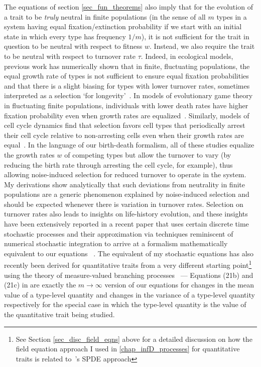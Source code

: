 The equations of section \ref{sec_fun_theorems} also imply that for the evolution of a trait to be \emph{truly} neutral in finite populations (in the sense of all $m$ types in a system having equal fixation/extinction probability if we start with an initial state in which every type has frequency $1/m$), it is not sufficient for the trait in question to be neutral with respect to fitness $w$. Instead, we also require the trait to be neutral with respect to turnover rate $\tau$.  Indeed, in ecological models, previous work has numerically shown that in finite, fluctuating populations, the equal growth rate of types is not sufficient to ensure equal fixation probabilities and that there is a slight biasing for types with lower turnover rates, sometimes interpreted as a selection `for longevity'~\citep{lin_features_2012, oliveira_advantage_2017,balasekaran_quasi-neutral_2022}. In models of evolutionary game theory in fluctuating finite populations, individuals with lower death rates have higher fixation probability even when growth rates are equalized~\citep{huang_stochastic_2015, czuppon_fixation_2018}. Similarly, models of cell cycle dynamics find that selection favors cell types that periodically arrest their cell cycle relative to non-arresting cells even when their growth rates are equal~\citep{wodarz_effect_2017}. In the language of our birth-death formalism, all of these studies equalize the growth rates $w$ of competing types but allow the turnover to vary (by reducing the birth rate through arresting the cell cycle, for example), thus allowing noise-induced selection for reduced turnover to operate in the system. My derivations show analytically that such deviations from neutrality in finite populations are a generic phenomenon explained by noise-induced selection and should be expected whenever there is variation in turnover rates. Selection on turnover rates also leads to insights on life-history evolution, and these insights have been extensively reported in a recent paper that uses certain discrete time stochastic processes and their approximation via techniques reminiscent of numerical stochastic integration to arrive at a formalism mathematically equivalent to our equations ~\citep{kuosmanen_turnover_2022}. The equivalent of my stochastic equations has also recently been derived for quantitative traits from a very different starting point\footnote{See Section \ref{sec_disc_field_eqns} above for a detailed discussion on how the field equation approach I used in \ref{chap_infD_processes} for quantitative traits is related to~\cite{week_white_2021}'s SPDE approach} using the theory of measure-valued branching processes~\citep{week_white_2021} --- Equations (21b) and (21c) in \cite{week_white_2021} are exactly the $m \to \infty$ version of our equations for changes in the mean value of a type-level quantity and changes in the variance of a type-level quantity respectively for the special case in which the type-level quantity is the value of the quantitative trait being studied.

